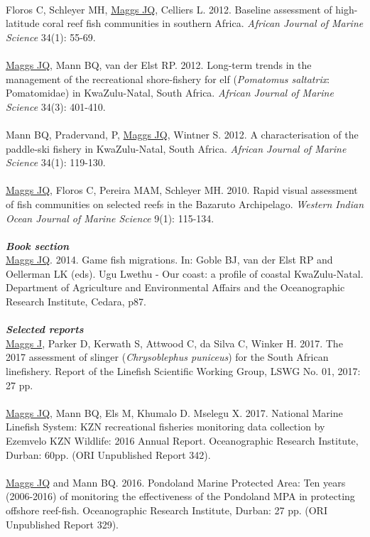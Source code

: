\documentclass[10pt,a4paper]{article}
\begin{document}
\\
Floros C, Schleyer MH, \underline{Maggs JQ}, Celliers L. 2012. Baseline assessment of high-latitude coral reef fish communities in southern Africa. \textit{African Journal of Marine Science} 34(1): 55-69.\\
\\
\underline{Maggs JQ}, Mann BQ, van der Elst RP. 2012. Long-term trends in the management of the recreational shore-fishery for elf (\textit{Pomatomus saltatrix}: Pomatomidae) in KwaZulu-Natal, South Africa. \textit{African Journal of Marine Science} 34(3): 401-410.\\
\\
Mann BQ, Pradervand, P, \underline{Maggs JQ}, Wintner S. 2012. A characterisation of the paddle-ski fishery in KwaZulu-Natal, South Africa. \textit{African Journal of Marine Science} 34(1): 119-130.\\
\\
\underline{Maggs JQ}, Floros C, Pereira MAM, Schleyer MH. 2010. Rapid visual assessment of fish communities on selected reefs in the Bazaruto Archipelago. \textit{Western Indian Ocean Journal of Marine Science} 9(1): 115-134.\\	
\\
\textit{\textbf{Book section}}\\
\underline{Maggs JQ}. 2014. Game fish migrations. In: Goble BJ, van der Elst RP and Oellerman LK (eds). Ugu Lwethu - Our coast: a profile of coastal KwaZulu-Natal. Department of Agriculture and Environmental Affairs and the Oceanographic Research Institute, Cedara, p87.\\
\\
\textit{\textbf{Selected reports}}\\
\underline{Maggs J}, Parker D, Kerwath S, Attwood C, da Silva C, Winker H. 2017. The 2017 assessment of slinger (\textit{Chrysoblephus puniceus}) for the South African linefishery. Report of the Linefish Scientific Working Group, LSWG No. 01, 2017: 27 pp.\\
\\
\underline{Maggs JQ}, Mann BQ, Els M, Khumalo D. Mselegu X. 2017. National Marine Linefish System: KZN recreational fisheries monitoring data collection by Ezemvelo KZN Wildlife: 2016 Annual Report. Oceanographic Research Institute, Durban: 60pp. (ORI Unpublished Report 342).\\
\\
\underline{Maggs JQ} and Mann BQ. 2016. Pondoland Marine Protected Area: Ten years (2006-2016) of monitoring the effectiveness of the Pondoland MPA in protecting offshore reef-fish. Oceanographic Research Institute, Durban: 27 pp. (ORI Unpublished Report 329).\\
\end{document}
